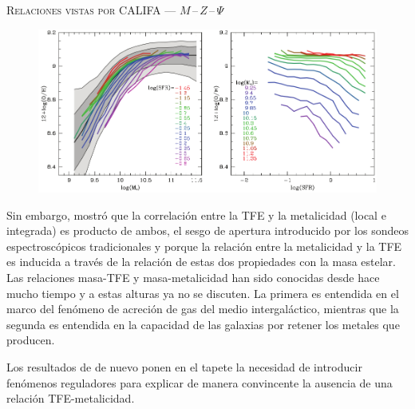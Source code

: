 \documentclass[xcolor=dvipsnames,4pt,hyperref={colorlinks,citecolor=black,linkcolor=black,urlcolor=black}]{beamer}
\begin{document}
\begin{frame}{\textsc{Relaciones vistas por CALIFA --- $M\,$--$\,Z\,$--$\,\Psi$}}

\begin{figure}
\includegraphics[scale=1]{img/mannucci2010-1}
\end{figure}

Sin embargo, \citet{Sanchez2013} mostró que la correlación entre la TFE y la metalicidad (local e
integrada) es producto de ambos, el sesgo de apertura introducido por los sondeos espectroscópicos
tradicionales y porque la relación entre la metalicidad y la TFE es inducida a través de la relación
de estas dos propiedades con la masa estelar. Las relaciones masa-TFE y masa-metalicidad han sido
conocidas desde hace mucho tiempo y a estas alturas ya no se discuten. La primera es entendida en el
marco del fenómeno de acreción de gas del medio intergaláctico, mientras que la segunda es entendida
en la capacidad de las galaxias por retener los metales que producen.

Los resultados de \citeauthor{Sanchez2013} de nuevo ponen en el tapete la necesidad de introducir
fenómenos reguladores para explicar de manera convincente la ausencia de una relación
TFE-metalicidad.

\end{frame}
\end{document}

